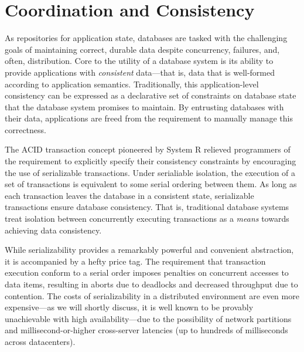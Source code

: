 
\section{Coordination and Consistency}
\label{sec:motivation}


As repositories for application state, databases are tasked with the
challenging goals of maintaining correct, durable data despite
concurrency, failures, and, often, distribution. Core to the utility
of a database system is its ability to provide applications with
\textit{consistent} data---that is, data that is well-formed according
to application semantics. Traditionally, this application-level
consistency can be expressed as a declarative set of constraints on
database state that the database system promises to maintain. By
entrusting databases with their data, applications are freed from the
requirement to manually manage this correctness.


 The ACID transaction concept
pioneered by System R relieved programmers of the requirement to
explicitly specify their consistency constraints by encouraging the
use of serializable transactions. Under serialiable isolation, the
execution of a set of transactions is equivalent to some serial
ordering between them. As long as each transaction leaves the database
in a consistent state, serializable transactions ensure database
consistency. That is, traditional database systems treat isolation
between concurrently executing transactions as a \textit{means}
towards achieving data consistency.


While serializability provides a remarkably powerful and convenient
abstraction, it is accompanied by a hefty price tag. The requirement
that transaction execution conform to a serial order imposes penalties
on concurrent accesses to data items, resulting in aborts due to
deadlocks and decreased throughput due to contention. The costs of
serializability in a distributed environment are even more
expensive---as we will shortly discuss, it is well known to be
provably unachievable with high availability---due to the possibility
of network partitions and millisecond-or-higher cross-server latencies
(up to hundreds of milliseconds across datacenters).

